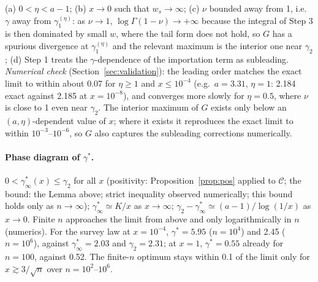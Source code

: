 \begin{remark}
(a) $0<\eta<a-1$; (b) $x\to0$ such that $w_s\to\infty$; (c) $\nu$ bounded away from 1,
i.e.\ $\gamma$ away from $\gamma_1^{(\eta)}$: as $\nu\to1$, $\log\Gamma(1-\nu)\to+\infty$ because the
integral of Step 3 is then dominated by small $w$, where the tail form does
not hold, so $G$ has a spurious divergence at $\gamma_1^{(\eta)}$ and the relevant
maximum is the interior one near $\gamma_2$; (d) Step 1 treats the $\gamma$-dependence of
the importation term as subleading.
\emph{Numerical check} (Section~\ref{sec:validation}): the leading order
matches the exact limit to within about 0.07 for $\eta\ge1$ and $x\le10^{-4}$ (e.g.\
$a=3.31$, $\eta=1$: 2.184 exact against 2.185 at $x=10^{-8}$), and converges more slowly
for $\eta=0.5$, where $\nu$ is close to 1 even near $\gamma_2$. The interior maximum of $G$
exists only below an $(a,\eta)$-dependent value of $x$; where it exists it
reproduces the exact limit to within $10^{-3}$--$10^{-6}$, so $G$ also captures the
subleading corrections numerically.
\end{remark}

\paragraph{Phase diagram of $\gamma^*$.} $0<\gamma^*_\infty(x)\le\gamma_2$ for all $x$ (positivity:
Proposition~\ref{prop:pos} applied to $\mathcal C$; the bound: the Lemma above; strict
inequality observed numerically; this bound holds only as $n\to\infty$); $\gamma^*_\infty\simeq K/x$ as
$x\to\infty$; $\gamma_2-\gamma^*_\infty\simeq(a-1)/\log(1/x)$ as $x\to0$. Finite $n$ approaches the limit from
above and only logarithmically in $n$ (numerics). For the survey law at $x=10^{-4}$,
$\gamma^*=5.95$ ($n=10^4$) and 2.45 ($n=10^6$), against $\gamma^*_\infty=2.03$ and $\gamma_2=2.31$; at $x=1$,
$\gamma^*=0.55$ already for $n=100$, against 0.52. The finite-$n$ optimum stays within 0.1 of
the limit only for $x\gtrsim3/\sqrt n$ over $n=10^2$--$10^6$.

